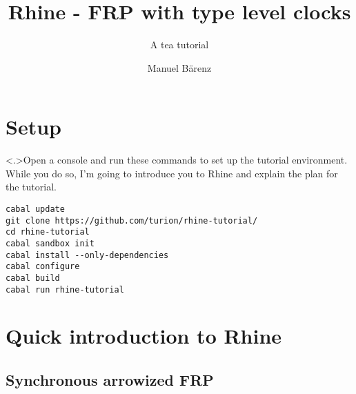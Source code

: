 \documentclass[handout]{enigtex-beamer-base}
\title{Rhine - FRP with type level clocks}
\subtitle{A tea tutorial}
\author{Manuel Bärenz}
\begin{document}
\begin{frame}
\titlepage
\end{frame}

\section{Setup}

\begin{frame}[fragile]
\note<.>{Open a console and run these commands to set up the tutorial environment.
While you do so, I'm going to introduce you to Rhine and explain the plan for the tutorial.}
\begin{verbatim}
cabal update
git clone https://github.com/turion/rhine-tutorial/
cd rhine-tutorial
cabal sandbox init
cabal install --only-dependencies
cabal configure
cabal build
cabal run rhine-tutorial
\end{verbatim}
\end{frame}

\section{Quick introduction to Rhine}

\subsection{Synchronous arrowized FRP}
\end{document}
